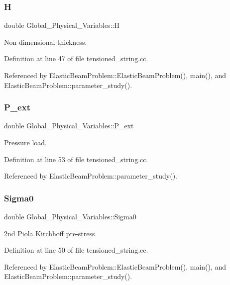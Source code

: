 \subsubsection{\texorpdfstring{H}{H}}
{\footnotesize\ttfamily double Global\+\_\+\+Physical\+\_\+\+Variables\+::H}



Non-\/dimensional thickness. 



Definition at line 47 of file tensioned\+\_\+string.\+cc.



Referenced by Elastic\+Beam\+Problem\+::\+Elastic\+Beam\+Problem(), main(), and Elastic\+Beam\+Problem\+::parameter\+\_\+study().

\mbox{\label{namespaceGlobal__Physical__Variables_a0406c0cbd463d1df2458fe5de98a00eb}} 
\subsubsection{\texorpdfstring{P\+\_\+ext}{P\_ext}}
{\footnotesize\ttfamily double Global\+\_\+\+Physical\+\_\+\+Variables\+::\+P\+\_\+ext}



Pressure load. 



Definition at line 53 of file tensioned\+\_\+string.\+cc.



Referenced by Elastic\+Beam\+Problem\+::parameter\+\_\+study().

\mbox{\label{namespaceGlobal__Physical__Variables_a417dc688a70c4f06ef0faed047068ba2}} 
\subsubsection{\texorpdfstring{Sigma0}{Sigma0}}
{\footnotesize\ttfamily double Global\+\_\+\+Physical\+\_\+\+Variables\+::\+Sigma0}



2nd Piola Kirchhoff pre-\/stress 



Definition at line 50 of file tensioned\+\_\+string.\+cc.



Referenced by Elastic\+Beam\+Problem\+::\+Elastic\+Beam\+Problem(), main(), and Elastic\+Beam\+Problem\+::parameter\+\_\+study().

